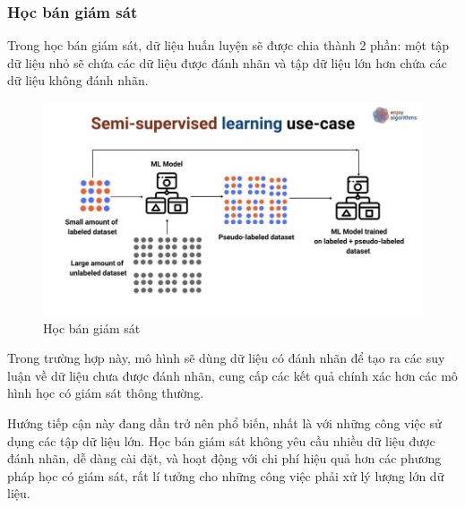 \subsubsection{Học bán giám sát}
Trong học bán giám sát, dữ liệu huấn luyện sẽ được chia thành 2 phần: một tập dữ liệu nhỏ sẽ chứa các dữ liệu được đánh nhãn và tập dữ liệu lớn hơn chứa các dữ liệu không đánh nhãn.
\begin{figure}[htb]
    \centering
    \includegraphics[width=\textwidth]{image/semi-supervised-learning.jpeg}
    \caption{Học bán giám sát}
    \label{figure:semi-supervised-learning}
\end{figure}

Trong trường hợp này, mô hình sẽ dùng dữ liệu có đánh nhãn để tạo ra các suy luận về dữ liệu chưa được đánh nhãn, cung cấp các kết quả chính xác hơn các mô hình học có giám sát thông thường.

Hướng tiếp cận này đang dần trở nên phổ biến, nhất là với những công việc sử dụng các tập dữ liệu lớn. Học bán giám sát không yêu cầu nhiều dữ liệu được đánh nhãn, dễ dàng cài đặt, và hoạt động với chi phí hiệu quả hơn các phương pháp học có giám sát, rất lí tưởng cho những công việc phải xử lý lượng lớn dữ liệu.\cite{webpage}

